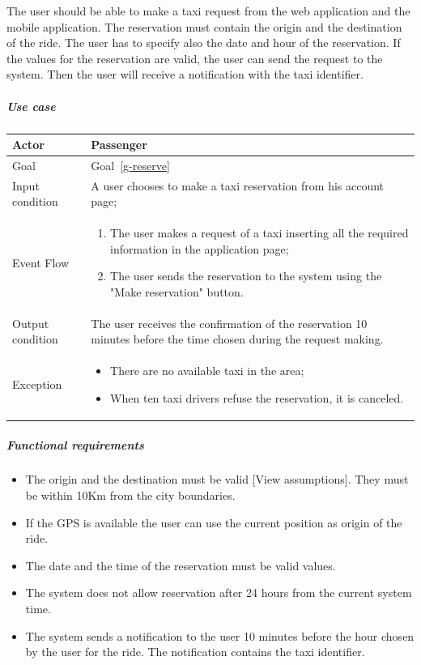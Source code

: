 The user should be able to make a taxi request from the web application and the mobile application. The reservation must contain the origin and the destination of the ride. The user has to specify also the date and hour of the reservation. If the values for the reservation are valid, the user can send the request to the system. Then the user will receive a notification with the taxi identifier.

\subparagraph{Use case}
\noindent
    \begin{center}
        \begin{longtable}{| l | p{} |}
            \hline
            Actor & Passenger \\
            \hline
            Goal & Goal~\ref{g-reserve}
            \\
            \hline
            Input condition & A user chooses to make a taxi reservation from his account page; \\
            \hline
            Event Flow & 
                \begin{enumerate}
                	\item The user makes a request of a taxi inserting all the required information in the application page;
                	\item The user sends the reservation to the system using the "Make reservation" button.
            	\end{enumerate}
            \\
            \hline
            Output condition & The user receives the confirmation of the reservation 10 minutes before the time chosen during the request making. \\
            \hline
            Exception & 
            \begin{itemize}
                \item There are no available taxi in the area;
                \item When ten taxi drivers refuse the reservation, it is canceled.
            \end{itemize} \\
            \hline
        \end{longtable}
    \end{center}

\subparagraph{Functional requirements}
\noindent
	\begin{itemize}
		\item The origin and the destination must be valid [View assumptions]. They must be within 10Km from the city boundaries.
		\item If the GPS is available the user can use the current position as origin of the ride.
		\item The date and the time of the reservation must be valid values.
		\item The system does not allow reservation after 24 hours from the current system time.
		\item The system sends a notification to the user 10 minutes before the hour chosen by the user for the ride. The notification contains the taxi identifier.
	\end{itemize}
	
